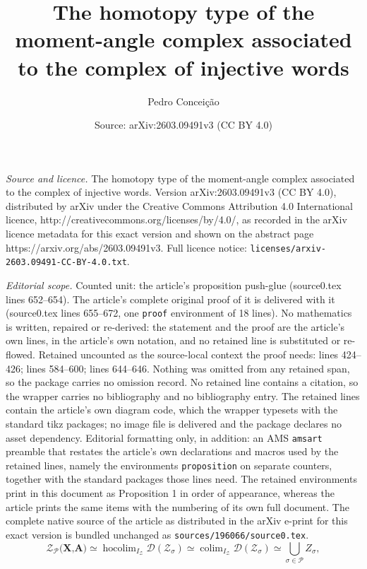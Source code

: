 \documentclass[10pt,a4paper]{amsart}
\title{The homotopy type of the moment-angle complex associated to the complex of injective words}
\author{Pedro Conceição}
\date{Source: arXiv:2603.09491v3 (CC BY 4.0)}
\newcommand{\DD}{\mathcal{D}}
\newcommand{\PP}{\mathcal{P}}
\newcommand{\ZZ}{\mathcal{Z}}
\DeclareMathOperator*{\colim}{colim}
\DeclareMathOperator*{\hocolim}{hocolim}
\begin{document}
\maketitle

\noindent\emph{Source and licence.} The homotopy type of the moment-angle complex associated to the complex of injective words. Version arXiv:2603.09491v3 (CC BY 4.0), distributed by arXiv under the Creative Commons Attribution 4.0 International licence, http://creativecommons.org/licenses/by/4.0/, as recorded in the arXiv licence metadata for this exact version and shown on the abstract page https://arxiv.org/abs/2603.09491v3. Full licence notice: \texttt{licenses/arxiv-2603.09491-CC-BY-4.0.txt}.\par\smallskip

\noindent\textit{Editorial scope.} Counted unit: the article's proposition push-glue (source0.tex lines 652--654). The article's complete original proof of it is delivered with it (source0.tex lines 655--672, one \texttt{proof} environment of 18 lines). No mathematics is written, repaired or re-derived: the statement and the proof are the article's own lines, in the article's own notation, and no retained line is substituted or re-flowed.  Retained uncounted as the source-local context the proof needs: lines 424--426; lines 584--600; lines 644--646.  Nothing was omitted from any retained span, so the package carries no omission record.  No retained line contains a citation, so the wrapper carries no bibliography and no bibliography entry.  The retained lines contain the article's own diagram code, which the wrapper typesets with the standard tikz packages; no image file is delivered and the package declares no asset dependency.  Editorial formatting only, in addition: an AMS \texttt{amsart} preamble that restates the article's own declarations and macros used by the retained lines, namely the environments \texttt{proposition} on separate counters, together with the standard packages those lines need.  The retained environments print in this document as Proposition 1 in order of appearance, whereas the article prints the same items with the numbering of its own full document.  The complete native source of the article as distributed in the arXiv e-print for this exact version is bundled unchanged as \texttt{sources/196066/source0.tex}.
\begin{equation}\label{union-equiv-levi}
	\ZZ_\PP\textbf{(X,A)} \simeq \hocolim_{I_\ZZ} \DD(\ZZ_\sigma) \simeq \colim_{I_\ZZ} \DD(\ZZ_\sigma) \simeq \bigcup_{\sigma \in \PP} Z_\sigma,
\end{equation}
\end{document}
